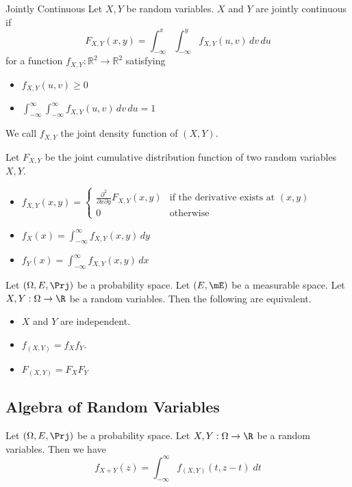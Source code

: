 \documentclass[a4paper]{article}
\begin{document}
\begin{defn}{Jointly Continuous}{} Let $X,Y$ be random variables. $X$ and $Y$ are jointly continuous if $$F_{X,Y}(x,y)=\int_{-\infty}^{x}\int_{-\infty}^{y}f_{X,Y}(u,v)\,dv\,du$$ for a function $f_{X,Y}:\mathbb{R}^2\to\mathbb{R}^2$ satisfying
\begin{itemize}
\item $f_{X,Y}(u,v)\geq 0$
\item $\int_{-\infty}^{\infty}\int_{-\infty}^{\infty}f_{X,Y}(u,v)\,dv\,du=1$
\end{itemize}
We call $f_{X,Y}$ the joint density function of $(X,Y)$. 
\end{defn}

\begin{thm}{}{} Let $F_{X,Y}$ be the joint cumulative distribution function of two random variables $X,Y$. 
\begin{itemize}
\item $f_{X,Y}(x,y)=\begin{cases}
\frac{\partial^2}{\partial x\partial y}F_{X,Y}(x,y)&\text{if the derivative exists at $(x,y)$}\\
0&\text{otherwise}
\end{cases}$
\item $f_X(x)=\int_{-\infty}^{\infty}f_{X,Y}(x,y)\,dy$
\item $f_Y(x)=\int_{-\infty}^{\infty}f_{X,Y}(x,y)\,dx$
\end{itemize}
\end{thm}

\begin{prp} Let $(\Omega,E,\Prj)$ be a probability space. Let $(E,\mE)$ be a measurable space. Let $X,Y:\Omega\to\R$ be a random variables. Then the following are equivalent. 
\begin{itemize}
\item $X$ and $Y$ are independent. 
\item $f_{(X,Y)}=f_Xf_Y$. 
\item $F_{(X,Y)}=F_XF_Y$
\end{itemize}
\end{prp}

\subsection{Algebra of Random Variables}
\begin{prp}{}{} Let $(\Omega,E,\Prj)$ be a probability space. Let $X,Y:\Omega\to\R$ be a random variables. Then we have $$f_{X+Y}(z)=\int_{-\infty}^\infty f_{(X,Y)}(t,z-t)\;dt$$
\end{prp}
\end{document}
